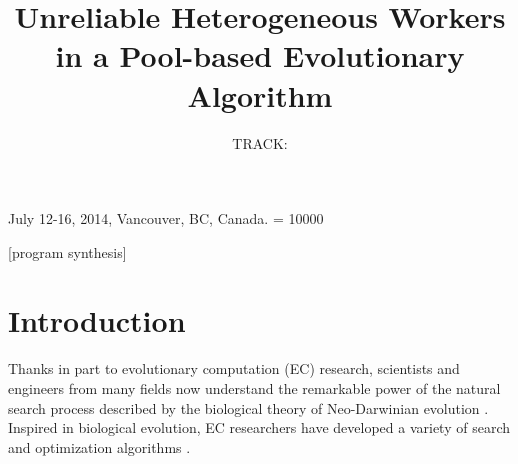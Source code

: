 \documentclass{sig-alternate}
\begin{document}
\title{ Unreliable Heterogeneous Workers in a Pool-based Evolutionary Algorithm}
\subtitle{TRACK: }

 {July 12-16, 2014, Vancouver, BC, Canada.}
    \widowpenalty = 10000

%
%

\maketitle              %

\begin{abstract}
\end{abstract}

[program synthesis]

\keywords{}

\section{Introduction}
\label{sec:intro}
Thanks in part  to evolutionary computation (EC) research, scientists and engineers from many fields now understand the remarkable power of
the natural search process described by the biological theory of Neo-Darwinian evolution \cite{holland}. 
Inspired in biological evolution, EC researchers have developed a variety of search and optimization algorithms \cite{eiben}.
\end{document}
